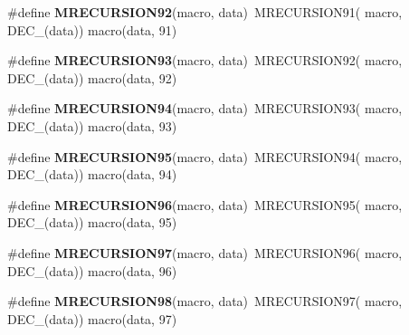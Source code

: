 \begin{DoxyCompactItemize}
\item 
\hypertarget{group__group__sam0__utils__mrecursion_gab27a1381cfcad4d4398dbd87166b9189}{}\#define {\bfseries M\+R\+E\+C\+U\+R\+S\+I\+O\+N92}(macro,  data)~M\+R\+E\+C\+U\+R\+S\+I\+O\+N91(  macro, D\+E\+C\+\_\+(data))   macro(data, 91)\label{group__group__sam0__utils__mrecursion_gab27a1381cfcad4d4398dbd87166b9189}

\item 
\hypertarget{group__group__sam0__utils__mrecursion_gaf2a7b1d3f531f42ba19275b3bfbc5096}{}\#define {\bfseries M\+R\+E\+C\+U\+R\+S\+I\+O\+N93}(macro,  data)~M\+R\+E\+C\+U\+R\+S\+I\+O\+N92(  macro, D\+E\+C\+\_\+(data))   macro(data, 92)\label{group__group__sam0__utils__mrecursion_gaf2a7b1d3f531f42ba19275b3bfbc5096}

\item 
\hypertarget{group__group__sam0__utils__mrecursion_ga71bbdabe0dca572550f55f325fdbcc53}{}\#define {\bfseries M\+R\+E\+C\+U\+R\+S\+I\+O\+N94}(macro,  data)~M\+R\+E\+C\+U\+R\+S\+I\+O\+N93(  macro, D\+E\+C\+\_\+(data))   macro(data, 93)\label{group__group__sam0__utils__mrecursion_ga71bbdabe0dca572550f55f325fdbcc53}

\item 
\hypertarget{group__group__sam0__utils__mrecursion_ga1f84d15b7e60fc215e8ebe7b5b151084}{}\#define {\bfseries M\+R\+E\+C\+U\+R\+S\+I\+O\+N95}(macro,  data)~M\+R\+E\+C\+U\+R\+S\+I\+O\+N94(  macro, D\+E\+C\+\_\+(data))   macro(data, 94)\label{group__group__sam0__utils__mrecursion_ga1f84d15b7e60fc215e8ebe7b5b151084}

\item 
\hypertarget{group__group__sam0__utils__mrecursion_ga3e4d11ac26580cc1a2f0c9df299a0414}{}\#define {\bfseries M\+R\+E\+C\+U\+R\+S\+I\+O\+N96}(macro,  data)~M\+R\+E\+C\+U\+R\+S\+I\+O\+N95(  macro, D\+E\+C\+\_\+(data))   macro(data, 95)\label{group__group__sam0__utils__mrecursion_ga3e4d11ac26580cc1a2f0c9df299a0414}

\item 
\hypertarget{group__group__sam0__utils__mrecursion_gab9ed28d94481bd01b1c3edcc6fce2dd6}{}\#define {\bfseries M\+R\+E\+C\+U\+R\+S\+I\+O\+N97}(macro,  data)~M\+R\+E\+C\+U\+R\+S\+I\+O\+N96(  macro, D\+E\+C\+\_\+(data))   macro(data, 96)\label{group__group__sam0__utils__mrecursion_gab9ed28d94481bd01b1c3edcc6fce2dd6}

\item 
\hypertarget{group__group__sam0__utils__mrecursion_ga09220b4e632b8d49bf826fee3f9235c7}{}\#define {\bfseries M\+R\+E\+C\+U\+R\+S\+I\+O\+N98}(macro,  data)~M\+R\+E\+C\+U\+R\+S\+I\+O\+N97(  macro, D\+E\+C\+\_\+(data))   macro(data, 97)\label{group__group__sam0__utils__mrecursion_ga09220b4e632b8d49bf826fee3f9235c7}


\end{DoxyCompactItemize}
